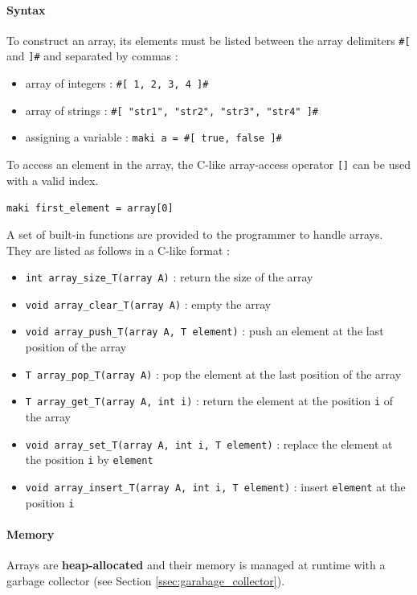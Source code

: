 \documentclass[a4paper,11pt]{article}
\begin{document}
\paragraph{Syntax}
To construct an array, its elements must be listed between the array delimiters \texttt{\#[} and \texttt{]\#} and separated by commas  :
\begin{itemize}
	\item array of integers : \texttt{\#[ 1, 2, 3, 4 ]\#}
	\item array of strings : \texttt{\#[ "str1", "str2", "str3", "str4" ]\#}
	\item assigning a variable : \texttt{maki a = \#[ true, false ]\#}
\end{itemize}
To access an element in the array, the C-like array-access operator \texttt{[]} can be used with a valid index.
\begin{center}
	\texttt{maki first\_element = array[0]}
\end{center}
A set of built-in functions are provided to the programmer to handle arrays. They are listed as follows in a C-like format :
\begin{itemize}
	\item \texttt{int array\_size\_T(array A)} : return the size of the array
	\item \texttt{void array\_clear\_T(array A)} : empty the array
	\item \texttt{void array\_push\_T(array A, T element)} : push an element at the last position of the array
	\item \texttt{T array\_pop\_T(array A)} : pop the element at the last position of the array
	\item \texttt{T array\_get\_T(array A, int i)} : return the element at the position \texttt{i} of the array
	\item \texttt{void array\_set\_T(array A, int i, T element)} : replace the element at the position \texttt{i} by \texttt{element}
	\item \texttt{void array\_insert\_T(array A, int i, T element)} : insert \texttt{element} at the position \texttt{i}
\end{itemize}
\paragraph{Memory} Arrays are \textbf{heap-allocated} and their memory is managed at runtime with a garbage collector (see Section \ref{ssec:garabage_collector}).
\end{document}
